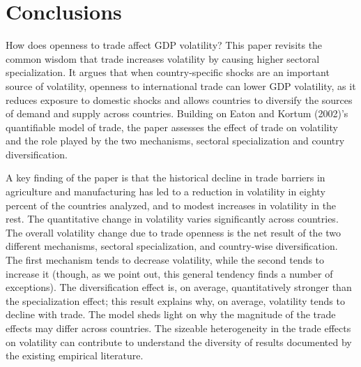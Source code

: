 \documentclass[12pt]{article}
\begin{document}
\section{Conclusions}

How does openness to trade affect GDP volatility? This paper revisits the
common wisdom that trade increases volatility by causing higher sectoral
specialization. It argues that when country-specific shocks are an important
source of volatility, openness to international trade can lower GDP
volatility, as it reduces exposure to domestic shocks and allows countries
to diversify the sources of demand and supply across countries. Building on
Eaton and Kortum (2002)'s quantifiable model of trade, the paper assesses
the effect of trade on volatility and the role played by the two mechanisms,
sectoral specialization and country diversification.

A key finding of the paper is that the historical decline in trade barriers
in agriculture and manufacturing has led to a reduction in volatility in
eighty percent of the countries analyzed, and to modest increases in
volatility in the rest. The quantitative change in volatility varies
significantly across countries. The overall volatility change due to trade
openness is the net result of the two different mechanisms, sectoral
specialization, and country-wise diversification. The first mechanism tends
to decrease volatility, while the second tends to increase it (though, as we
point out, this general tendency finds a number of exceptions). The
diversification effect is, on average, quantitatively stronger than the
specialization effect; this result explains why, on average, volatility
tends to decline with trade. The model sheds light on why the magnitude of
the trade effects may differ across countries. The sizeable heterogeneity in
the trade effects on volatility can contribute to understand the diversity
of results documented by the existing empirical literature.
\end{document}
